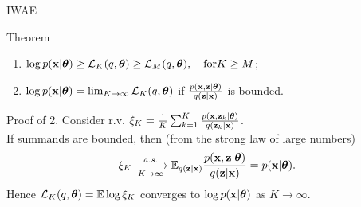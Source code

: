 \begin{frame}{IWAE}
	\begin{block}{Theorem}
		\begin{enumerate}
			\item $\log p(\mathbf{x} | \boldsymbol{\theta}) \geq \mathcal{L}_K (q, \boldsymbol{\theta}) \geq \mathcal{L}_M (q, \boldsymbol{\theta}), \quad \text{for} K \geq M$;
			\item $\log p(\mathbf{x} | \boldsymbol{\theta}) = \lim_{K \rightarrow \infty} \mathcal{L}_K (q, \boldsymbol{\theta})$ if $\frac{p(\mathbf{x}, \mathbf{z} | \boldsymbol{\theta})}{q(\mathbf{z} | \mathbf{x})}$ is bounded.
		\end{enumerate}
		\vspace{-0.2cm}
	\end{block}
	\begin{block}{Proof of 2.}
		\vspace{0.2cm}
		Consider r.v. $\xi_K = \frac{1}{K}\sum_{k=1}^K \frac{p(\mathbf{x}, \mathbf{z}_k | \boldsymbol{\theta})}{q(\mathbf{z}_k | \mathbf{x})}$. \\
		\vspace{0.2cm}
		If summands are bounded, then (from the strong law of large numbers)
		\[
		\xi_K \xrightarrow[K \rightarrow \infty]{a.s.} \mathbb{E}_{q(\mathbf{z} | \mathbf{x})} \frac{p(\mathbf{x}, \mathbf{z} | \boldsymbol{\theta})}{q(\mathbf{z} | \mathbf{x})} = p(\mathbf{x} | \boldsymbol{\theta}).
		\]
		Hence $\mathcal{L}_K (q, \boldsymbol{\theta}) = \mathbb{E} \log \xi_K$ converges to $\log p(\mathbf{x} | \boldsymbol{\theta})$ as $K \rightarrow \infty$.
	\end{block}

\end{frame}
